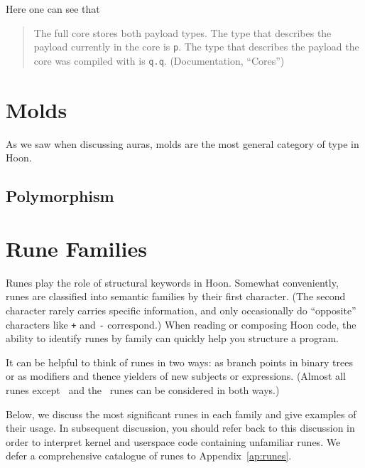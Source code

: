 Here one can see that

\begin{quote}
The full core stores both payload types.  The type that describes the payload currently in the core is \texttt{p}.  The type that describes the payload the core was compiled with is \texttt{q.q}.  (Documentation, “Cores”)
\end{quote}



\section{Molds}

As we saw when discussing auras, molds are the most general category of type in Hoon.


\subsection{Polymorphism}

\section{Rune Families}


Runes play the role of structural keywords in Hoon.  Somewhat conveniently, runes are classified into semantic families by their first character.  (The second character rarely carries specific information, and only occasionally do “opposite” characters like \texttt{+} and \texttt{-} correspond.)  When reading or composing Hoon code, the ability to identify runes by family can quickly help you structure a program.

It can be helpful to think of runes in two ways:  as branch points in binary trees or as modifiers and thence yielders of new subjects or expressions.  (Almost all runes except \pzapzap~and the \psig~runes can be considered in both ways.)

Below, we discuss the most significant runes in each family and give examples of their usage.  In subsequent discussion, you should refer back to this discussion in order to interpret kernel and userspace code containing unfamiliar runes.  We defer a comprehensive catalogue of runes to Appendix~\ref{ap:runes}.

